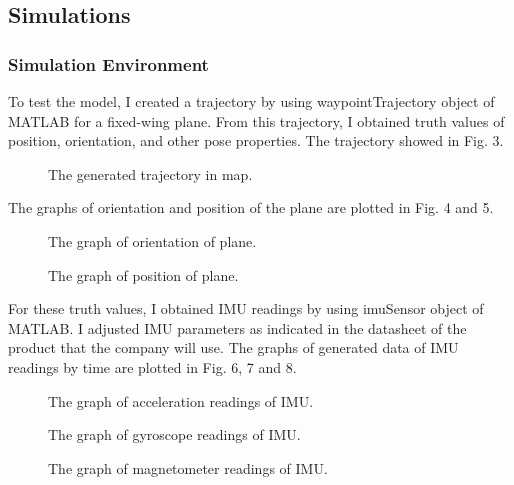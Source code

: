 \documentclass[12pt]{article}
\begin{document}
    \subsection{Simulations}

    \subsubsection{Simulation Environment}
    To test the model, I created a trajectory by using waypointTrajectory 
    object of MATLAB for a fixed-wing plane. From this trajectory, I obtained 
    truth values of position, orientation, and other pose properties. The trajectory 
    showed in Fig. 3.\\

    \begin{figure}[H]
        \centerline{}
        \caption{The generated trajectory in map.}
    \end{figure}
    The graphs of orientation and position of the plane are plotted in Fig. 4 and 5.
    \begin{figure}[H]
        \centerline{}
        \caption{The graph of orientation of plane.}
    \end{figure}
    \begin{figure}[H]
        \centerline{}
        \caption{The graph of position of plane.}
    \end{figure}
    
    For these truth values, I obtained IMU readings by using imuSensor 
    object of MATLAB. I 
    adjusted IMU parameters as indicated in the datasheet of the product 
    that the company will use. The graphs of generated data of IMU 
    readings by time are plotted in Fig. 6, 7 and 8.

    \begin{figure}[H]
        \centerline{}
        \caption{The graph of acceleration readings of IMU.}
    \end{figure}
    \begin{figure}[H]
        \centerline{}
        \caption{The graph of gyroscope readings of IMU.}
    \end{figure}
    \begin{figure}[H]
        \centerline{}
        \caption{The graph of magnetometer readings of IMU.}
    \end{figure}
\end{document}
